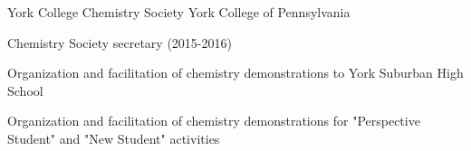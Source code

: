 \begin{cventries}

\cventry
  {}
  {York College Chemistry Society} %
  {York College of Pennsylvania} %
  {}
  {
    \begin{cvitems}
      \item{Chemistry Society secretary (2015-2016)}
      \item{Organization and facilitation of chemistry demonstrations to York Suburban High School}
      \item{Organization and facilitation of chemistry demonstrations for "Perspective Student" and "New Student" activities}
    \end{cvitems}
  }



\end{cventries}
